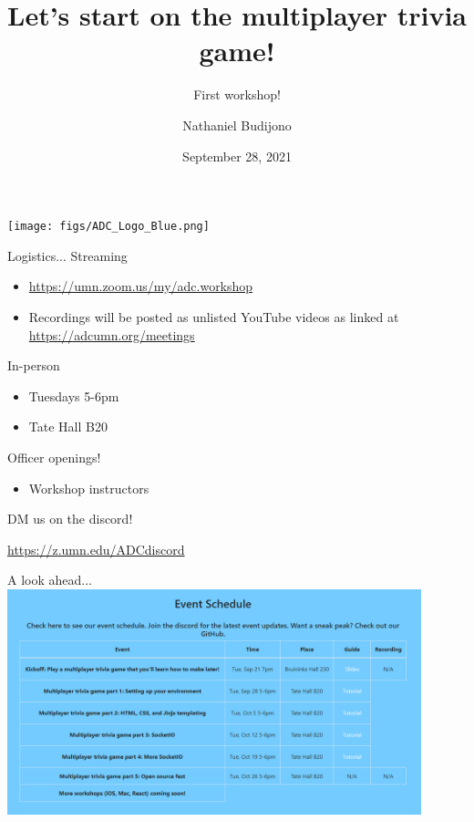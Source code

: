 \documentclass{beamer}
\title{Let's start on the multiplayer trivia game!}
\subtitle{First workshop!}
\author{Nathaniel Budijono}
\date{September 28, 2021}
\institute{UMN ADC}
\begin{document}
\begin{frame}
    \titlepage
    \texttt{[image: figs/ADC\_Logo\_Blue.png]}
\end{frame}

\begin{frame}{Logistics...}
	Streaming
	\begin{itemize}
		\item \href{https://umn.zoom.us/my/adc.workshop}{https://umn.zoom.us/my/adc.workshop}
		\item Recordings will be posted as unlisted YouTube videos as linked at \href{https://adcumn.org/meetings}{https://adcumn.org/meetings}
	\end{itemize}

	\bigskip\pause

	In-person
	\begin{itemize}
		\item Tuesdays 5-6pm
		\item Tate Hall B20
	\end{itemize}
\end{frame}

\begin{frame}{Officer openings!}
	\begin{itemize}
		\item Workshop instructors
	\end{itemize}

	\bigskip

	DM us on the discord!

	\bigskip

	\href{https://z.umn.edu/ADCdiscord}{https://z.umn.edu/ADCdiscord}
\end{frame}

\begin{frame}{A look ahead...}
	\centering
	\includegraphics[width=0.9\textwidth]{figs/schedule.png}
\end{frame}
\end{document}
